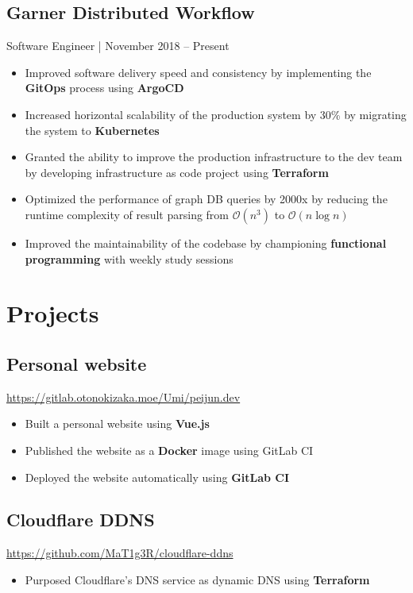 \documentclass[letterpaper,12pt,oneside]{article}
\newcommand{\smallurl}[1]{\footnotesize{\url{#1}}\normalsize}
\begin{document}
\subsection*{Garner Distributed Workflow}
Software Engineer | November 2018 -- Present
\begin{itemize}
      \setlength\itemsep{0em}
      \item Improved software delivery speed and consistency by implementing the \textbf{GitOps} process using \textbf{ArgoCD}
      \item Increased horizontal scalability of the production system by 30\% by migrating the system to \textbf{Kubernetes}
      \item Granted the ability to improve the production infrastructure to the dev team by developing infrastructure as code project using \textbf{Terraform}
      \item Optimized the performance of graph DB queries by 2000x by reducing the runtime complexity of result parsing from $\mathcal{O}(n^3)$ to $\mathcal{O}(n\log{}n)$
      \item Improved the maintainability of the codebase by championing \textbf{functional programming} with weekly study sessions
\end{itemize}

\section*{Projects}

\subsection*{Personal website \hfill {}}
\smallurl{https://gitlab.otonokizaka.moe/Umi/peijun.dev}
\begin{itemize}
      \setlength\itemsep{0em}
      \item Built a personal website using \textbf{Vue.js}
      \item Published the website as a \textbf{Docker} image using GitLab CI
      \item Deployed the website automatically using \textbf{GitLab CI}
\end{itemize}

\subsection*{Cloudflare DDNS \hfill {}}
\smallurl{https://github.com/MaT1g3R/cloudflare-ddns}
\begin{itemize}
      \setlength\itemsep{0em}
      \item Purposed Cloudflare's DNS service as dynamic DNS using \textbf{Terraform}
\end{itemize}
\end{document}

